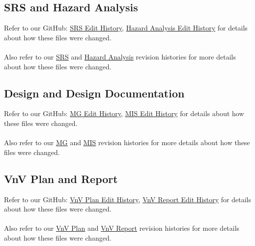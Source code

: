 \documentclass{article}
\begin{document}
\subsection{SRS and Hazard Analysis}

Refer to our GitHub: \href{https://github.com/John-Popovici/duel-of-the-eights/commits/main/docs/SRS}{SRS Edit History}, \href{https://github.com/John-Popovici/duel-of-the-eights/commits/main/docs/HazardAnalysis}{Hazard Analysis Edit History} for details about how these files were changed.
\\
\\
Also refer to our \href{https://github.com/John-Popovici/duel-of-the-eights/blob/main/docs/SRS/SRS.pdf}{SRS} and \href{https://github.com/John-Popovici/duel-of-the-eights/blob/main/docs/HazardAnalysis/HazardAnalysis.pdf}{Hazard Analysis} revision histories for more details about how these files were changed.

\subsection{Design and Design Documentation}

Refer to our GitHub: \href{https://github.com/John-Popovici/duel-of-the-eights/commits/main/docs/Design/SoftArchitecture}{MG Edit History}, \href{https://github.com/John-Popovici/duel-of-the-eights/commits/main/docs/Design/SoftDetailedDes}{MIS Edit History} for details about how these files were changed.
\\
\\
Also refer to our \href{https://github.com/John-Popovici/duel-of-the-eights/blob/main/docs/Design/SoftArchitecture/MG.pdf}{MG} and \href{https://github.com/John-Popovici/duel-of-the-eights/blob/main/docs/Design/SoftDetailedDes/MIS.pdf}{MIS} revision histories for more details about how these files were changed.

\subsection{VnV Plan and Report}

Refer to our GitHub: \href{https://github.com/John-Popovici/duel-of-the-eights/commits/main/docs/VnVPlan}{VnV Plan Edit History}, \href{https://github.com/John-Popovici/duel-of-the-eights/commits/main/docs/VnVReport}{VnV Report Edit History} for details about how these files were changed.
\\
\\
Also refer to our \href{https://github.com/John-Popovici/duel-of-the-eights/blob/main/docs/VnVPlan/VnVPlan.pdf}{VnV Plan} and \href{https://github.com/John-Popovici/duel-of-the-eights/blob/main/docs/VnVReport/VnVReport.pdf}{VnV Report} revision histories for more details about how these files were changed.
\end{document}
